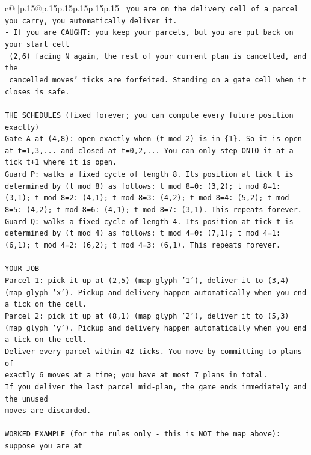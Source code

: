 \documentclass{article}
\begin{document}
{\begin{supertabular}{c@{$\;$}|p{.15\linewidth}@{}p{.15\linewidth}p{.15\linewidth}p{.15\linewidth}p{.15\linewidth}p{.15\linewidth}}
{{{\texttt{     you are on the delivery cell of a parcel you carry, you automatically deliver it.} \\
\texttt{{-} If you are CAUGHT: you keep your parcels, but you are put back on your start cell} \\
\texttt{  (2,6) facing N again, the rest of your current plan is cancelled, and the} \\
\texttt{  cancelled moves' ticks are forfeited. Standing on a gate cell when it closes is safe.} \\
\\ 
\texttt{THE SCHEDULES (fixed forever; you can compute every future position exactly)} \\
\texttt{Gate A at (4,8): open exactly when (t mod 2) is in \{1\}. So it is open at t=1,3,... and closed at t=0,2,... You can only step ONTO it at a tick t+1 where it is open.} \\
\texttt{Guard P: walks a fixed cycle of length 8. Its position at tick t is determined by (t mod 8) as follows: t mod 8=0: (3,2); t mod 8=1: (3,1); t mod 8=2: (4,1); t mod 8=3: (4,2); t mod 8=4: (5,2); t mod 8=5: (4,2); t mod 8=6: (4,1); t mod 8=7: (3,1). This repeats forever.} \\
\texttt{Guard Q: walks a fixed cycle of length 4. Its position at tick t is determined by (t mod 4) as follows: t mod 4=0: (7,1); t mod 4=1: (6,1); t mod 4=2: (6,2); t mod 4=3: (6,1). This repeats forever.} \\
\\ 
\texttt{YOUR JOB} \\
\texttt{Parcel 1: pick it up at (2,5) (map glyph '1'), deliver it to (3,4) (map glyph 'x'). Pickup and delivery happen automatically when you end a tick on the cell.} \\
\texttt{Parcel 2: pick it up at (8,1) (map glyph '2'), deliver it to (5,3) (map glyph 'y'). Pickup and delivery happen automatically when you end a tick on the cell.} \\
\texttt{Deliver every parcel within 42 ticks. You move by committing to plans of} \\
\texttt{exactly 6 moves at a time; you have at most 7 plans in total.} \\
\texttt{If you deliver the last parcel mid{-}plan, the game ends immediately and the unused} \\
\texttt{moves are discarded.} \\
\\ 
\texttt{WORKED EXAMPLE (for the rules only {-} this is NOT the map above): suppose you are at} \\
}}}
\end{supertabular}}
\end{document}
